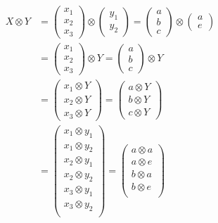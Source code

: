 \documentclass[10pt, openany]{book}
\begin{document}
\begin{equation}
\begin{aligned}
X \otimes Y 
&=\begin{pmatrix}x_1 \\ x_2 \\ x_3\end{pmatrix} \otimes \begin{pmatrix}y_1 \\ y_2\end{pmatrix}
=\begin{pmatrix}a \\ b \\ c\end{pmatrix} \otimes \begin{pmatrix}a \\ e\end{pmatrix} \\
&=\begin{pmatrix}x_1 \\ x_2 \\ x_3\end{pmatrix} \otimes Y
=\begin{pmatrix}a \\ b \\ c\end{pmatrix} \otimes Y \\
&=\begin{pmatrix}x_1 \otimes Y \\ x_2 \otimes Y \\ x_3 \otimes Y\end{pmatrix}
=\begin{pmatrix}a \otimes Y \\ b \otimes Y \\ c \otimes Y\end{pmatrix} \\
&=\begin{pmatrix}x_1 \otimes y_1 \\x_1 \otimes y_2 \\
    x_2 \otimes y_1 \\x_2 \otimes y_2 \\
    x_3 \otimes y_1 \\x_3 \otimes y_2 \\\end{pmatrix}
=\begin{pmatrix}a \otimes a \\ a \otimes e \\
    b \otimes a \\ b \otimes e \\

\end{pmatrix}
\end{aligned}
\end{equation}
\end{document}
